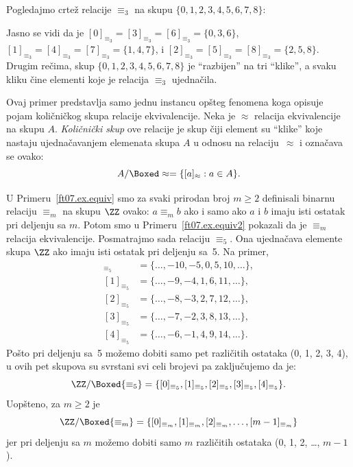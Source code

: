 \begin{EX}
  Pogledajmo crte\v z relacije $\equiv_3$ na skupu $\{0, 1, 2, 3, 4, 5, 6, 7, 8\}$:
  \begin{center}
    
  \end{center}
  Jasno se vidi da je
  $[0]_{\equiv_3} = [3]_{\equiv_3} = [6]_{\equiv_3} = \{0, 3, 6\}$,
  $[1]_{\equiv_3} = [4]_{\equiv_3} = [7]_{\equiv_3} = \{1, 4, 7\}$, i
  $[2]_{\equiv_3} = [5]_{\equiv_3} = [8]_{\equiv_3} = \{2, 5, 8\}$.
  Drugim re\v cima, skup $\{0, 1, 2, 3, 4, 5, 6, 7, 8\}$ je ``razbijen'' na tri ``klike'', a svaku kliku \v cine elementi
  koje je relacija $\equiv_3$ ujedna\v cila.
\end{EX}

Ovaj primer predstavlja samo jednu instancu op\v steg fenomena koga opisuje pojam koli\v cni\v ckog skupa relacije ekvivalencije.
Neka je $\approx$ relacija ekvivalencije na skupu $A$. \emph{Koli\v cni\v cki skup} ove relacije je skup \v ciji element
su ``klike'' koje nastaju ujedna\v cavanjem elemenata skupa $A$ u odnosu na relaciju~$\approx$ i ozna\v cava se ovako:
$$
  A / \Boxed\approx = \{[a]_\approx : a \in A\}.
$$
\begin{EX}
  U Primeru~\ref{ft07.ex.equiv} smo za svaki prirodan broj $m \ge 2$ definisali binarnu relaciju $\equiv_m$
  na skupu $\ZZ$ ovako: $a \equiv_m b$ ako i samo ako $a$ i $b$ imaju isti ostatak pri deljenju sa $m$.
  Potom smo u Primeru~\ref{ft07.ex.equiv2} pokazali da je $\equiv_m$ relacija ekvivalencije.
  Posmatrajmo sada relaciju $\equiv_5$. Ona ujedna\v cava elemente skupa $\ZZ$ ako imaju isti ostatak pri deljenju
  sa~5. Na primer,
  \begin{align*}
    [0]_{\equiv_5} &= \{\ldots, -10, -5, 0, 5, 10, \ldots\},\\
    [1]_{\equiv_5} &= \{\ldots, -9, -4, 1, 6, 11, \ldots\},\\
    [2]_{\equiv_5} &= \{\ldots, -8, -3, 2, 7, 12, \ldots\},\\
    [3]_{\equiv_5} &= \{\ldots, -7, -2, 3, 8, 13, \ldots\},\\
    [4]_{\equiv_5} &= \{\ldots, -6, -1, 4, 9, 14, \ldots\}.
  \end{align*}
  Po\v sto pri deljenju sa~5 mo\v zemo dobiti samo pet razli\v citih ostataka (0, 1, 2, 3, 4), u ovih pet skupova
  su svrstani svi celi brojevi pa zaklju\v cujemo da je:
  $$
    \ZZ / \Boxed{\equiv_5} = \{[0]_{\equiv_5}, [1]_{\equiv_5}, [2]_{\equiv_5}, [3]_{\equiv_5}, [4]_{\equiv_5}\}.
  $$
  Uop\v steno, za $m \ge 2$ je
  $$
    \ZZ / \Boxed{\equiv_m} = \{[0]_{\equiv_m}, [1]_{\equiv_m}, [2]_{\equiv_m}, \ldots, [m-1]_{\equiv_m}\}
  $$
  jer pri deljenju sa $m$ mo\v zemo dobiti samo $m$ razli\v citih ostataka (0, 1, 2, \ldots, $m-1$).
\end{EX}

